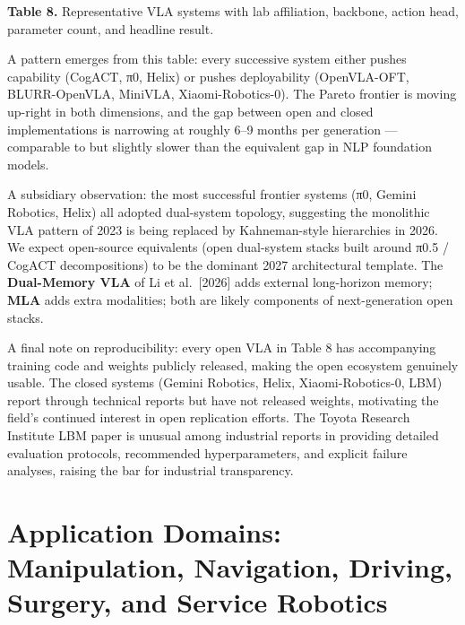 \documentclass{article}
\begin{document}
\textbf{Table 8.} Representative VLA systems with lab affiliation, backbone, action head, parameter count, and headline result.

A pattern emerges from this table: every successive system either pushes capability (CogACT, π0, Helix) or pushes deployability (OpenVLA-OFT, BLURR-OpenVLA, MiniVLA, Xiaomi-Robotics-0). The Pareto frontier is moving up-right in both dimensions, and the gap between open and closed implementations is narrowing at roughly 6--9 months per generation --- comparable to but slightly slower than the equivalent gap in NLP foundation models.

A subsidiary observation: the most successful frontier systems (π0, Gemini Robotics, Helix) all adopted dual-system topology, suggesting the monolithic VLA pattern of 2023 is being replaced by Kahneman-style hierarchies in 2026. We expect open-source equivalents (open dual-system stacks built around π0.5 / CogACT decompositions) to be the dominant 2027 architectural template. The \textbf{Dual-Memory VLA} of Li et al.~{[}2026{]} adds external long-horizon memory; \textbf{MLA} adds extra modalities; both are likely components of next-generation open stacks.

A final note on reproducibility: every open VLA in Table 8 has accompanying training code and weights publicly released, making the open ecosystem genuinely usable. The closed systems (Gemini Robotics, Helix, Xiaomi-Robotics-0, LBM) report through technical reports but have not released weights, motivating the field's continued interest in open replication efforts. The Toyota Research Institute LBM paper \cite{barreiros2026acarefulexaminatio} is unusual among industrial reports in providing detailed evaluation protocols, recommended hyperparameters, and explicit failure analyses, raising the bar for industrial transparency.

\section{Application Domains: Manipulation, Navigation, Driving, Surgery, and Service Robotics}\label{application-domains-manipulation-navigation-driving-surgery-and-service-robotics}
\end{document}
